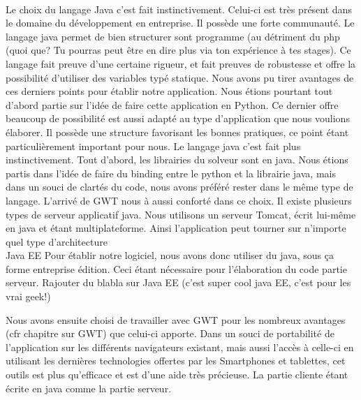 \\
Le choix du langage Java c'est fait instinctivement. Celui-ci est très présent dans le domaine du développement en entreprise. Il possède une forte communauté. Le langage java permet de bien structurer sont programme (au détriment du php (quoi que? Tu pourras peut être en dire plus via ton expérience à tes stages). Ce langage fait preuve d'une certaine rigueur, et fait preuves de robustesse et offre la possibilité d'utiliser des variables typé statique. Nous avons pu tirer avantages de ces derniers points pour établir notre application.
Nous étions pourtant tout d'abord partie sur l'idée de faire cette application en Python. Ce dernier offre beaucoup de possibilité est aussi adapté au type d'application que nous voulions élaborer. Il possède une structure favorisant les bonnes pratiques, ce point étant particulièrement important pour nous. Le langage java c'est fait plus instinctivement. Tout d'abord, les librairies du solveur sont en java. Nous étions partis dans l'idée de faire du binding entre le python et la librairie java, mais dans un souci de clartés du code, nous avons préféré rester dans le même type de langage. L'arrivé de GWT nous à aussi conforté dans ce choix.
Il existe plusieurs types de serveur applicatif java. Nous utilisons un serveur Tomcat, écrit lui-même en java et étant multiplateforme. Ainsi l'application peut tourner sur n'importe quel type d'architecture
\\
Java EE
Pour établir notre logiciel, nous avons donc utiliser du java, sous ça forme entreprise édition. Ceci étant nécessaire pour l'élaboration du code partie serveur. Rajouter du blabla sur Java EE (c'est super cool java EE, c'est pour les vrai geek!)

Nous avons ensuite choisi de travailler avec GWT pour les nombreux avantages (cfr chapitre sur GWT) que celui-ci apporte. Dans un souci de portabilité de l'application sur les différents navigateurs existant, mais aussi l'accès à celle-ci en utilisant les dernières technologies offertes par les Smartphones et tablettes, cet outils est plus qu'efficace et est d'une aide très précieuse. La partie cliente étant écrite en java comme la partie serveur.
